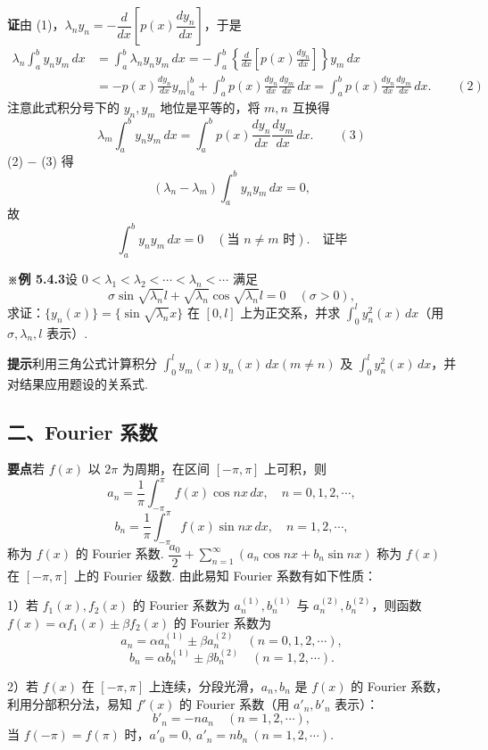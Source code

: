\documentclass[UTF8,12pt,a4paper,fontset=fandol]{ctexart}
\begin{document}
\noindent\textbf{证}\quad 由 (1)，$\lambda_ny_n=-\dfrac d{dx}\left[p(x)\dfrac{dy_n}{dx}\right]$，于是
\[
\begin{aligned}
\lambda_n\int_a^b y_ny_m\,dx
&=\int_a^b\lambda_ny_ny_m\,dx
=-\int_a^b\left\{\frac d{dx}\left[p(x)\frac{dy_n}{dx}\right]\right\}y_m\,dx\\
&=-p(x)\frac{dy_n}{dx}y_m\bigg|_a^b
+\int_a^b p(x)\frac{dy_n}{dx}\frac{dy_m}{dx}\,dx
=\int_a^b p(x)\frac{dy_n}{dx}\frac{dy_m}{dx}\,dx. \qquad(2)
\end{aligned}
\]
注意此式积分号下的 $y_n,y_m$ 地位是平等的，将 $m,n$ 互换得
\[
  \lambda_m\int_a^b y_ny_m\,dx
  =\int_a^b p(x)\frac{dy_n}{dx}\frac{dy_m}{dx}\,dx. \qquad(3)
\]
(2) $-$ (3) 得
\[
  (\lambda_n-\lambda_m)\int_a^b y_ny_m\,dx=0,
\]
故
\[
  \int_a^b y_ny_m\,dx=0\quad(\text{当 }n\ne m\text{ 时}).\quad\text{证毕}
\]

\noindent\textbf{※例 5.4.3}\quad 设 $0<\lambda_1<\lambda_2<\cdots<\lambda_n<\cdots$ 满足
\[
  \sigma\sin\sqrt{\lambda_n}l+\sqrt{\lambda_n}\cos\sqrt{\lambda_n}l=0\quad(\sigma>0),
\]
求证：$\{y_n(x)\}=\{\sin\sqrt{\lambda_n}x\}$ 在 $[0,l]$ 上为正交系，并求 $\displaystyle\int_0^l y_n^2(x)\,dx$（用 $\sigma,\lambda_n,l$ 表示）.

\noindent\textbf{提示}\quad 利用三角公式计算积分 $\displaystyle\int_0^l y_m(x)y_n(x)\,dx(m\ne n)$ 及 $\displaystyle\int_0^l y_n^2(x)\,dx$，并对结果应用题设的关系式.

\subsection*{二、Fourier 系数}

\noindent\textbf{要点}\quad 若 $f(x)$ 以 $2\pi$ 为周期，在区间 $[-\pi,\pi]$ 上可积，则
\[
  a_n=\frac1\pi\int_{-\pi}^{\pi}f(x)\cos nx\,dx,\quad n=0,1,2,\cdots,
\]
\[
  b_n=\frac1\pi\int_{-\pi}^{\pi}f(x)\sin nx\,dx,\quad n=1,2,\cdots,
\]
称为 $f(x)$ 的 Fourier 系数. $\dfrac{a_0}2+\displaystyle\sum_{n=1}^{\infty}(a_n\cos nx+b_n\sin nx)$ 称为 $f(x)$ 在 $[-\pi,\pi]$ 上的 Fourier 级数. 由此易知 Fourier 系数有如下性质：

1）若 $f_1(x),f_2(x)$ 的 Fourier 系数为 $a_n^{(1)},b_n^{(1)}$ 与 $a_n^{(2)},b_n^{(2)}$，则函数 $f(x)=\alpha f_1(x)\pm\beta f_2(x)$ 的 Fourier 系数为
\[
  a_n=\alpha a_n^{(1)}\pm\beta a_n^{(2)}\quad(n=0,1,2,\cdots),
\]
\[
  b_n=\alpha b_n^{(1)}\pm\beta b_n^{(2)}\quad(n=1,2,\cdots).
\]

2）若 $f(x)$ 在 $[-\pi,\pi]$ 上连续，分段光滑，$a_n,b_n$ 是 $f(x)$ 的 Fourier 系数，利用分部积分法，易知 $f'(x)$ 的 Fourier 系数（用 $a'_n,b'_n$ 表示）：
\[
  b'_n=-na_n\quad(n=1,2,\cdots),
\]
当 $f(-\pi)=f(\pi)$ 时，$a'_0=0,\ a'_n=nb_n\ (n=1,2,\cdots)$.
\end{document}
